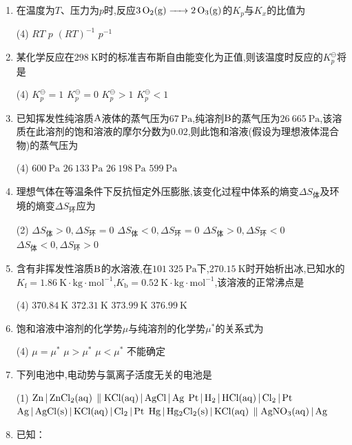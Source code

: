 \begin{enumerate}[label=\arabic*., itemsep=1.5ex]
    \item 在温度为$T$、压力为$p$时,反应$\ce{3O2(g) -> 2O3(g)}$的$K_p$与$K_x$的比值为
    \begin{tasks}(4)
        \task $RT$
        \task $p$
        \task $(RT)^{-1}$
        \task $p^{-1}$
    \end{tasks}
    \item 某化学反应在$298\ \mathrm{K}$时的标准吉布斯自由能变化为正值,则该温度时反应的$K_p^\ominus$将是
    \begin{tasks}(4)
        \task $K_p^\ominus=1$
        \task $K_p^\ominus=0$
        \task $K_p^\ominus>1$
        \task $K_p^\ominus<1$
    \end{tasks}
    \item 已知挥发性纯溶质$\ce{A}$液体的蒸气压为$67\ \mathrm{Pa}$,纯溶剂$\ce{B}$的蒸气压为$26\ 665\ \mathrm{Pa}$,该溶质在此溶剂的饱和溶液的摩尔分数为$0.02$,则此饱和溶液(假设为理想液体混合物)的蒸气压为
    \begin{tasks}(4)
        \task $600\ \mathrm{Pa}$
        \task $26\ 133\ \mathrm{Pa}$
        \task $26\ 198\ \mathrm{Pa}$
        \task $599\ \mathrm{Pa}$
    \end{tasks}
    \item 理想气体在等温条件下反抗恒定外压膨胀,该变化过程中体系的熵变$\Delta S_\text{体}$及环境的熵变$\Delta S_\text{环}$应为
    \begin{tasks}(2)
        \task $\Delta S_\text{体}>0,\Delta S_\text{环}=0$
        \task $\Delta S_\text{体}<0,\Delta S_\text{环}=0$
        \task $\Delta S_\text{体}>0,\Delta S_\text{环}<0$
        \task $\Delta S_\text{体}<0,\Delta S_\text{环}>0$
    \end{tasks}
    \item 含有非挥发性溶质$\ce{B}$的水溶液,在$101\ 325\ \mathrm{Pa}$下,$270.15\ \mathrm{K}$时开始析出冰,已知水的$K_\mathrm{f}=1.86\ \mathrm{K\cdot kg\cdot mol^{-1}}$,$K_\mathrm{b}=0.52\ \mathrm{K\cdot kg\cdot mol^{-1}}$,该溶液的正常沸点是
    \begin{tasks}(4)
        \task $370.84\ \mathrm{K}$
        \task $372.31\ \mathrm{K}$
        \task $373.99\ \mathrm{K}$
        \task $376.99\ \mathrm{K}$
    \end{tasks}
    \item 饱和溶液中溶剂的化学势$\mu$与纯溶剂的化学势$\mu^*$的关系式为
    \begin{tasks}(4)
        \task $\mu=\mu^*$
        \task $\mu>\mu^*$
        \task $\mu<\mu^*$
        \task 不能确定
    \end{tasks}
    \item 下列电池中,电动势与氯离子活度无关的电池是
    \begin{tasks}(1)
        \task $\ce{Zn | ZnCl2(aq) \parallel KCl(aq) | AgCl | Ag}$
        \task $\ce{Pt | H2 | HCl(aq) | Cl2 | Pt}$
        \task $\ce{Ag | AgCl(s) | KCl(aq) | Cl2 | Pt}$
        \task $\ce{Hg | Hg2Cl2(s) | KCl(aq) \parallel AgNO3(aq) | Ag}$
    \end{tasks}
    \item 已知：
    

\end{enumerate}
